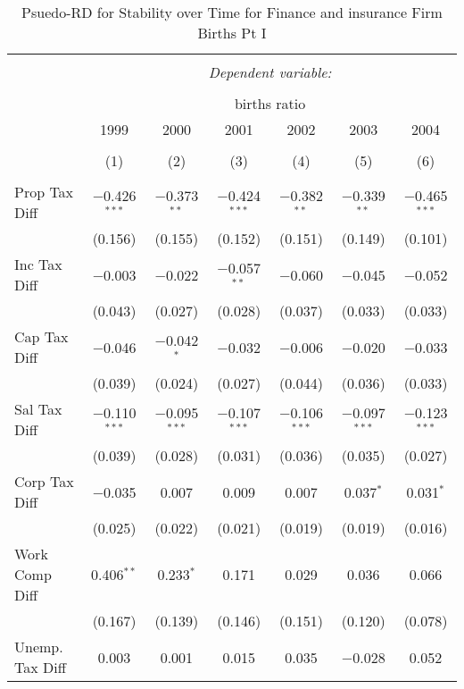 
\begin{table}[!htbp] \centering 
  \caption{Psuedo-RD for Stability over Time for  Finance and insurance Firm Births Pt I} 
  \label{52year} 
\small 
\begin{tabular}{@{\extracolsep{5pt}}lcccccc} 
\\[-1.8ex]\hline 
\hline \\[-1.8ex] 
 & \multicolumn{6}{c}{\textit{Dependent variable:}} \\ 
\cline{2-7} 
\\[-1.8ex] & \multicolumn{6}{c}{births ratio} \\ 
 & 1999 & 2000 & 2001 & 2002 & 2003 & 2004 \\ 
\\[-1.8ex] & (1) & (2) & (3) & (4) & (5) & (6)\\ 
\hline \\[-1.8ex] 
 Prop Tax Diff & $-$0.426$^{***}$ & $-$0.373$^{**}$ & $-$0.424$^{***}$ & $-$0.382$^{**}$ & $-$0.339$^{**}$ & $-$0.465$^{***}$ \\ 
  & (0.156) & (0.155) & (0.152) & (0.151) & (0.149) & (0.101) \\ 
  Inc Tax Diff & $-$0.003 & $-$0.022 & $-$0.057$^{**}$ & $-$0.060 & $-$0.045 & $-$0.052 \\ 
  & (0.043) & (0.027) & (0.028) & (0.037) & (0.033) & (0.033) \\ 
  Cap Tax Diff & $-$0.046 & $-$0.042$^{*}$ & $-$0.032 & $-$0.006 & $-$0.020 & $-$0.033 \\ 
  & (0.039) & (0.024) & (0.027) & (0.044) & (0.036) & (0.033) \\ 
  Sal Tax Diff & $-$0.110$^{***}$ & $-$0.095$^{***}$ & $-$0.107$^{***}$ & $-$0.106$^{***}$ & $-$0.097$^{***}$ & $-$0.123$^{***}$ \\ 
  & (0.039) & (0.028) & (0.031) & (0.036) & (0.035) & (0.027) \\ 
  Corp Tax Diff & $-$0.035 & 0.007 & 0.009 & 0.007 & 0.037$^{*}$ & 0.031$^{*}$ \\ 
  & (0.025) & (0.022) & (0.021) & (0.019) & (0.019) & (0.016) \\ 
  Work Comp Diff & 0.406$^{**}$ & 0.233$^{*}$ & 0.171 & 0.029 & 0.036 & 0.066 \\ 
  & (0.167) & (0.139) & (0.146) & (0.151) & (0.120) & (0.078) \\ 
  Unemp. Tax Diff & 0.003 & 0.001 & 0.015 & 0.035 & $-$0.028 & 0.052 \\ 

\end{tabular}
\end{table}
